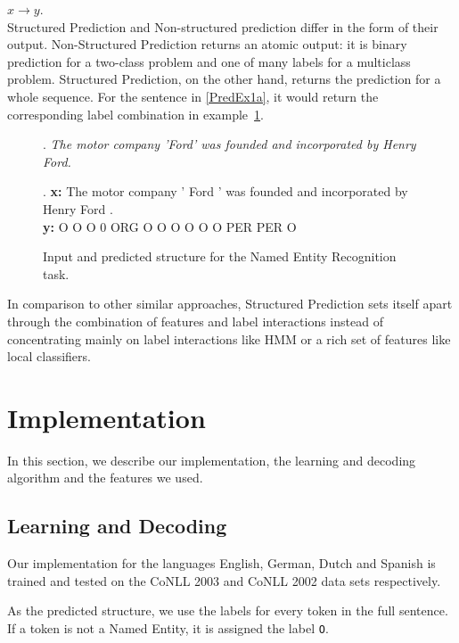 \documentclass[11pt]{article}
\newcommand{\namedentity}{Named Entity}
\newcommand{\Oo}{\texttt O}
\begin{document}
$ x \rightarrow y $. \\

Structured Prediction and Non-structured prediction differ in the form of their output.
Non-Structured Prediction returns an atomic output: it is binary prediction for a two-class problem and one of many labels for a multiclass problem. 
Structured Prediction, on the other hand, returns the prediction for a whole sequence. 
For the sentence in \ref{PredEx1a}, it would return the corresponding label combination in example~\ref{PredEx1b}. 

\begin{figure}[ht]

\ex. \emph{The motor company 'Ford' was founded and incorporated  by Henry Ford.} \label{PredEx1a}
 
\exg. \textbf{x:} The motor company ' Ford ' was founded and incorporated by Henry Ford .\\
      \textbf{y:}  O   O      O     0 ORG  O  O     O     O       O        O PER   PER  O  \label{PredEx1b} \\
\caption{Input and predicted structure for the Named Entity Recognition task.}

\end{figure}

In comparison to other similar approaches, Structured Prediction sets itself apart through the combination of features and label interactions instead
of concentrating mainly on label interactions like HMM or a rich set of features like local classifiers. 

\section{Implementation}
In this section, we describe our implementation, the learning and decoding algorithm and the features we used.


\subsection{Learning and Decoding}

Our implementation for the languages English, German, Dutch and Spanish is trained and tested on the CoNLL 2003 and CoNLL 2002 data sets respectively. 

As the predicted structure, we use the labels for every token in the full sentence. If a token is not a \namedentity, it is assigned the label \Oo.
\end{document}
